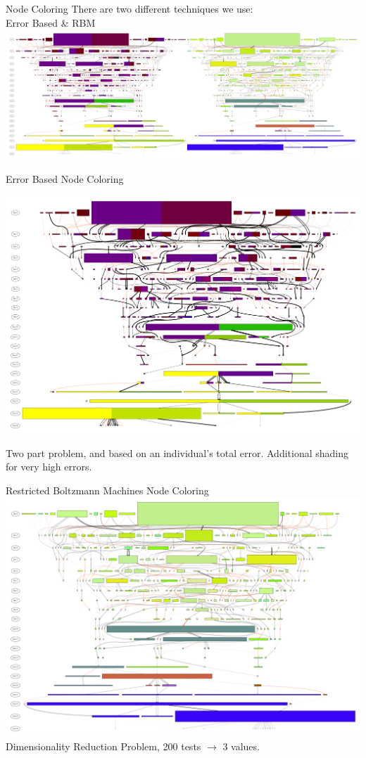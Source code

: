 \documentclass{beamer}
\begin{document}
\begin{frame}{Node Coloring}
\center
{There are two different techniques we use:  \\ Error Based  \&  RBM}
\includegraphics[width=\textwidth]{Illustrations/run0_dual_and_RBM_full.pdf}
\end{frame}

\begin{frame}{Error Based Node Coloring}
	\begin{overprint}
		 			\centering
\includegraphics[width=.7\textwidth]{Illustrations/run0_bi_color_shaded_percent0.pdf}
	\end{overprint}
	\begin{overprint}
		\onslide<1>
		\centering
		Two part problem, and based on an individual's total error.
		\onslide<2>
		\centering
		Additional shading for very high errors.
	\end{overprint}
\end{frame}

\begin{frame}{Restricted Boltzmann Machines Node Coloring}
\centering
\includegraphics[width=.7\textwidth]{Illustrations/run0_RBM_color_full_30000.pdf} \\
Dimensionality Reduction Problem, 200 tests $\rightarrow$ 3 values.
\end{frame}
\end{document}
